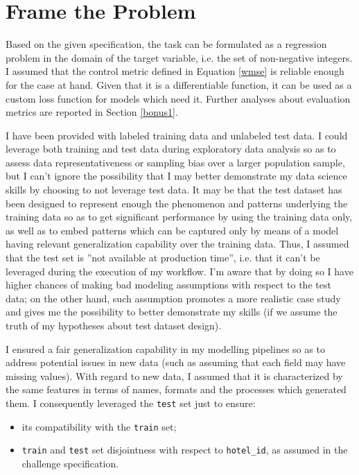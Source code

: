 \documentclass[preprint,12pt,3p]{elsarticle}
\begin{document}
\section{Frame the Problem}
Based on the given specification, the task can be formulated as a regression problem in the domain of the target variable, i.e. the set of non-negative integers. I assumed that the control metric defined in Equation \ref{wmse} is reliable enough for the case at hand. Given that it is a differentiable function, it can be used as a custom loss function for models which need it. Further analyses about evaluation metrics are reported in Section \ref{bonus1}.

I have been provided with labeled training data and unlabeled test data. I could leverage both training and test data during exploratory data analysis so as to assess data representativeness or sampling bias over a larger population sample, but I can't ignore the possibility that I may better demonstrate my data science skills by choosing to not leverage test data. It may be that the test dataset has been designed to represent enough the phenomenon and patterns underlying the training data so as to get significant performance by using the training data only, as well as to embed patterns which can be captured only by means of a model having relevant generalization capability over the training data. Thus, I assumed that the test set is ''not available at production time'', i.e. that it can't be leveraged during the execution of my workflow. I'm aware that by doing so I have higher chances of making bad modeling assumptions with respect to the test data; on the other hand, such assumption promotes a more realistic case study and gives me the possibility to better demonstrate my skills (if we assume the truth of my hypotheses about test dataset design).

I ensured a fair generalization capability in my modelling pipelines so as to address potential issues in new data (such as assuming that each field may have missing values). With regard to new data, I assumed that it is characterized by the same features in terms of names, formats and the processes which generated them. I consequently leveraged the \verb|test| set just to ensure:
\begin{itemize}
	\item its compatibility with the \verb|train| set;
	\item \verb|train| and \verb|test| set disjointness with respect to \verb|hotel_id|, as assumed in the challenge specification.
\end{itemize}
\end{document}
